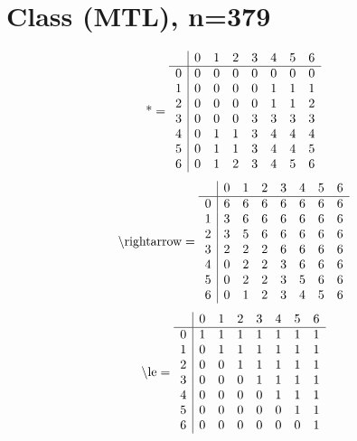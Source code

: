 \documentclass[11pt]{article}
\begin{document}
\section{Class (MTL), n=379}
\[\text{*} = 
\begin{array}{r | r r r r r r r}
 & 0 & 1 & 2 & 3 & 4 & 5 & 6 \\ \hline
0 & 0 & 0 & 0 & 0 & 0 & 0 & 0 \\
1 & 0 & 0 & 0 & 0 & 1 & 1 & 1 \\
2 & 0 & 0 & 0 & 0 & 1 & 1 & 2 \\
3 & 0 & 0 & 0 & 3 & 3 & 3 & 3 \\
4 & 0 & 1 & 1 & 3 & 4 & 4 & 4 \\
5 & 0 & 1 & 1 & 3 & 4 & 4 & 5 \\
6 & 0 & 1 & 2 & 3 & 4 & 5 & 6 \\
\end{array}
\]
\[\text{\textbackslash rightarrow} = 
\begin{array}{r | r r r r r r r}
 & 0 & 1 & 2 & 3 & 4 & 5 & 6 \\ \hline
0 & 6 & 6 & 6 & 6 & 6 & 6 & 6 \\
1 & 3 & 6 & 6 & 6 & 6 & 6 & 6 \\
2 & 3 & 5 & 6 & 6 & 6 & 6 & 6 \\
3 & 2 & 2 & 2 & 6 & 6 & 6 & 6 \\
4 & 0 & 2 & 2 & 3 & 6 & 6 & 6 \\
5 & 0 & 2 & 2 & 3 & 5 & 6 & 6 \\
6 & 0 & 1 & 2 & 3 & 4 & 5 & 6 \\
\end{array}
\]
\[\text{\textbackslash le} = 
\begin{array}{r | r r r r r r r}
 & 0 & 1 & 2 & 3 & 4 & 5 & 6 \\ \hline
0 & 1 & 1 & 1 & 1 & 1 & 1 & 1 \\
1 & 0 & 1 & 1 & 1 & 1 & 1 & 1 \\
2 & 0 & 0 & 1 & 1 & 1 & 1 & 1 \\
3 & 0 & 0 & 0 & 1 & 1 & 1 & 1 \\
4 & 0 & 0 & 0 & 0 & 1 & 1 & 1 \\
5 & 0 & 0 & 0 & 0 & 0 & 1 & 1 \\
6 & 0 & 0 & 0 & 0 & 0 & 0 & 1 \\
\end{array}
\]
\end{document}
